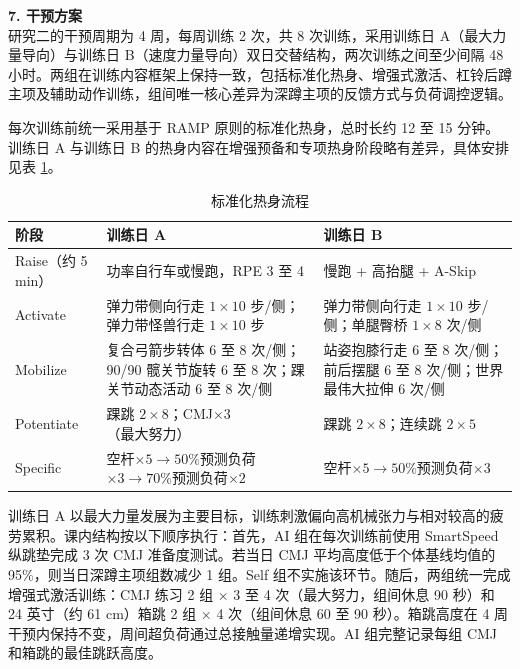 \documentclass[UTF8,zihao=-4,twoside,openany]{ctexbook}
\begin{document}
\vspace{0.2cm}
\noindent \textbf{7. 干预方案} \\
研究二的干预周期为 4 周，每周训练 2 次，共 8 次训练，采用训练日 A（最大力量导向）与训练日 B（速度力量导向）双日交替结构，两次训练之间至少间隔 48 小时。两组在训练内容框架上保持一致，包括标准化热身、增强式激活、杠铃后蹲主项及辅助动作训练，组间唯一核心差异为深蹲主项的反馈方式与负荷调控逻辑。

每次训练前统一采用基于 RAMP 原则的标准化热身，总时长约 12 至 15 分钟。训练日 A 与训练日 B 的热身内容在增强预备和专项热身阶段略有差异，具体安排见表 \ref{tab:ch3-ramp}。

\begin{table}[htbp]
  \centering
  \caption{标准化热身流程}
  \label{tab:ch3-ramp}
  \vspace{6pt}
  \small
  \begin{tabularx}{\textwidth}{|m{2.2cm}|X|X|}
    \hline
    \textbf{阶段} & \textbf{训练日 A} & \textbf{训练日 B} \\ \hline
    Raise（约 5 min） & 功率自行车或慢跑，RPE 3 至 4 & 慢跑 + 高抬腿 + A-Skip \\ \hline
    Activate & 弹力带侧向行走 $1\times 10$ 步/侧；弹力带怪兽行走 $1\times 10$ 步 & 弹力带侧向行走 $1\times 10$ 步/侧；单腿臀桥 $1\times 8$ 次/侧 \\ \hline
    Mobilize & 复合弓箭步转体 6 至 8 次/侧；90/90 髋关节旋转 6 至 8 次；踝关节动态活动 6 至 8 次/侧 & 站姿抱膝行走 6 至 8 次/侧；前后摆腿 6 至 8 次/侧；世界最伟大拉伸 6 次/侧 \\ \hline
    Potentiate & 踝跳 $2\times 8$；CMJ$\times 3$（最大努力） & 踝跳 $2\times 8$；连续跳 $2\times 5$ \\ \hline
    Specific & 空杆$\times 5 \rightarrow 50\%$预测负荷$\times 3 \rightarrow 70\%$预测负荷$\times 2$ & 空杆$\times 5 \rightarrow 50\%$预测负荷$\times 3$ \\ \hline
  \end{tabularx}
\end{table}

训练日 A 以最大力量发展为主要目标，训练刺激偏向高机械张力与相对较高的疲劳累积。课内结构按以下顺序执行：首先，AI 组在每次训练前使用 SmartSpeed 纵跳垫完成 3 次 CMJ 准备度测试。若当日 CMJ 平均高度低于个体基线均值的 95\%，则当日深蹲主项组数减少 1 组。Self 组不实施该环节。随后，两组统一完成增强式激活训练：CMJ 练习 2 组 $\times$ 3 至 4 次（最大努力，组间休息 90 秒）和 24 英寸（约 61 cm）箱跳 2 组 $\times$ 4 次（组间休息 60 至 90 秒）。箱跳高度在 4 周干预内保持不变，周间超负荷通过总接触量递增实现。AI 组完整记录每组 CMJ 和箱跳的最佳跳跃高度。
\end{document}
